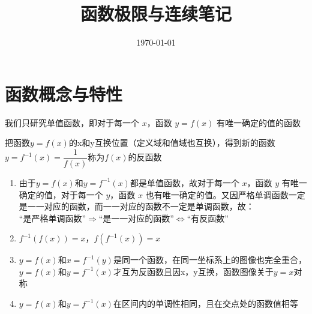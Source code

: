 \documentclass{ctexart}
\title{函数极限与连续笔记}
\date{\today}
\begin{document}
\maketitle

\section{函数概念与特性}

\begin{theorem}[函数]
    我们只研究单值函数，即对于每一个 $x$，函数 $y=f(x)$ 有唯一确定的值的函数
\end{theorem}

\begin{theorem}[反函数]
    把函数$y=f(x)$的x和y互换位置（定义域和值域也互换），得到新的函数$y=f^{-1}(x)=\dfrac{1}{f(x)}$称为$f(x)$的反函数    
    \begin{enumerate}
        \item 由于$y=f(x)$和$y=f^{-1}(x)$都是单值函数，故对于每一个 $x$，函数 $y$ 有唯一确定的值，对于每一个 $y$，函数 $x$ 也有唯一确定的值。又因严格单调函数一定是一一对应的函数，而一一对应的函数不一定是单调函数，故：\\
        “是严格单调函数”$\Rightarrow$“是一一对应的函数”$\Leftrightarrow$“有反函数”
        \item $f^{-1}(f(x))=x$，$f(f^{-1}(x))=x$
        \item $y=f(x)$和$x=f^{-1}(y)$是同一个函数，在同一坐标系上的图像也完全重合，$y=f(x)$和$y=f^{-1}(x)$才互为反函数且因x，y互换，函数图像关于$y=x$对称
        \item $y=f(x)$和$y=f^{-1}(x)$在区间内的单调性相同，且在交点处的函数值相等
    \end{enumerate}
\end{theorem}
\end{document}
